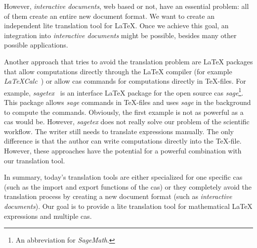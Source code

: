 However, \textit{interactive documents}, web based or not, have an essential problem: all of them create an entire new document format. We want to create an independent lite translation tool for \LaTeX. Once we achieve this goal, an integration into \textit{interactive documents} might be possible, besides many other possible applications.

Another approach that tries to avoid the translation problem are \LaTeX{} packages that allow computations directly through the \LaTeX{} compiler (for example \textit{LaTeXCalc}~\parencite{LatexCalc}) or allow \gls{cas} commands for computations directly in \TeX -files. For example, \textit{sagetex}~\parencite{Sagetex} is an interface \LaTeX{} package for the open source \gls{cas} \textit{sage}\footnote{An abbreviation for \textit{SageMath}.}. This package allows \textit{sage} commands in \TeX -files and uses \textit{sage} in the background to compute the commands. Obviously, the first example is not as powerful as a \gls{cas} would be. However, \textit{sagetex} does not really solve our problem of the scientific workflow. The writer still needs to translate expressions manually. The only difference is that the author can write computations directly into the \TeX -file. However, these approaches have the potential for a powerful combination with our translation tool.

In summary, today's translation tools are either specialized for one specific \gls{cas} (such as the import and export functions of the \gls{cas}) or they completely avoid the translation process by creating a new document format (such as \textit{interactive documents}). Our goal is to provide a lite translation tool for mathematical \LaTeX{} expressions and multiple \gls{cas}.